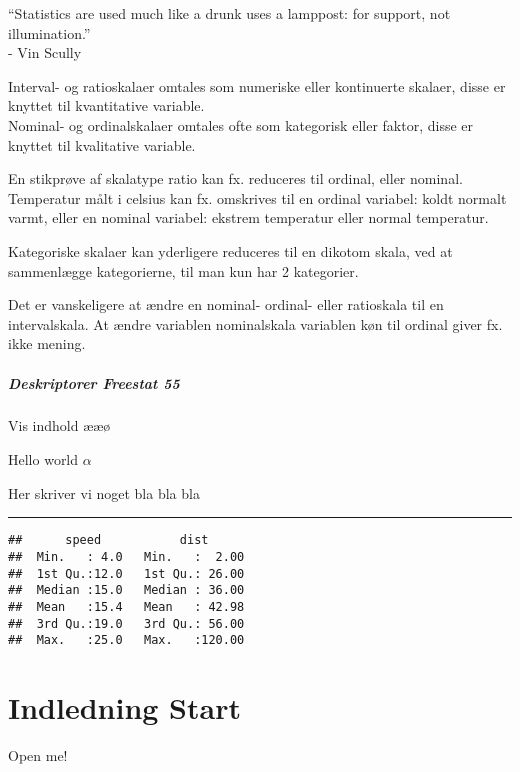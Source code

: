 \documentclass[]{book}
\let\oldparagraph\paragraph
\renewcommand{\paragraph}[1]{\oldparagraph{#1}\mbox{}}
\theoremstyle{definition}
\theoremstyle{definition}
\theoremstyle{definition}
\theoremstyle{remark}
\begin{document}
``Statistics are used much like a drunk uses a lamppost: for support,
not illumination.''\\
- Vin Scully

Interval- og ratioskalaer omtales som numeriske eller kontinuerte
skalaer, disse er knyttet til kvantitative variable.\\
Nominal- og ordinalskalaer omtales ofte som kategorisk eller faktor,
disse er knyttet til kvalitative variable.

En stikprøve af skalatype ratio kan fx. reduceres til ordinal, eller
nominal. Temperatur målt i celsius kan fx. omskrives til en ordinal
variabel: koldt normalt varmt, eller en nominal variabel: ekstrem
temperatur eller normal temperatur.

Kategoriske skalaer kan yderligere reduceres til en dikotom skala, ved
at sammenlægge kategorierne, til man kun har 2 kategorier.

Det er vanskeligere at ændre en nominal- ordinal- eller ratioskala til
en intervalskala. At ændre variablen nominalskala variablen køn til
ordinal giver fx. ikke mening.

\hypertarget{deskriptorer-freestat-55}{%
\paragraph{Deskriptorer Freestat 55}\label{deskriptorer-freestat-55}}

Vis indhold ææø

\leavevmode\hypertarget{BlockName2}{}%
Hello world \(\alpha\)

Her skriver vi noget bla bla bla

\begin{center}\rule{0.5\linewidth}{\linethickness}\end{center}

\begin{verbatim}
##      speed           dist       
##  Min.   : 4.0   Min.   :  2.00  
##  1st Qu.:12.0   1st Qu.: 26.00  
##  Median :15.0   Median : 36.00  
##  Mean   :15.4   Mean   : 42.98  
##  3rd Qu.:19.0   3rd Qu.: 56.00  
##  Max.   :25.0   Max.   :120.00
\end{verbatim}

\hypertarget{indledning-start}{%
\chapter{Indledning Start}\label{indledning-start}}

Open me!
\end{document}

